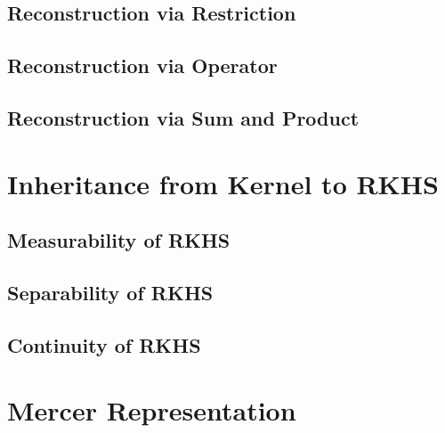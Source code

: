 \documentclass[a4paper,12pt]{article}
\theoremstyle{remark}
\theoremstyle{definition}
\theoremstyle{definition}
\theoremstyle{definition}
\begin{document}
\subsection{Reconstruction via Restriction}
\subsection{Reconstruction via Operator}
\subsection{Reconstruction via Sum and Product}

\section{Inheritance from Kernel to RKHS}
\subsection{Measurability of RKHS}
\subsection{Separability of RKHS}
\subsection{Continuity of RKHS}

\section{Mercer Representation}


\end{document}
